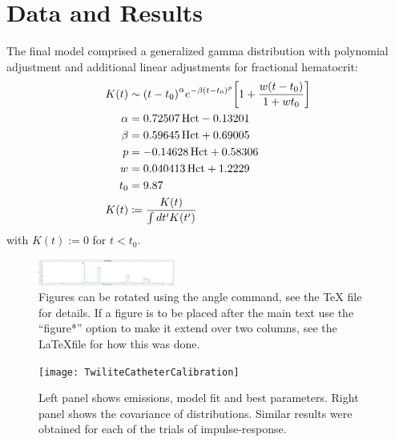 \section{Data and Results}

The final model comprised a generalized gamma distribution with polynomial
adjustment and additional linear adjustments for fractional hematocrit:
%
\begin{align}
	K(t) &\sim \qty(t - t_0)^\alpha e^{-\beta\qty(t - t_0)^p} 
	           \qty[1 + \frac{w \qty(t - t_0)}{1 + w t_0}] \\
	\alpha &= 0.72507 \, \text{Hct} - 0.13201 \\
	\beta &= 0.59645 \, \text{Hct} + 0.69005 \\
    p &= -0.14628 \, \text{Hct} + 0.58306 \\
	w &= 0.040413 \, \text{Hct} + 1.2229 \\
	t_0 & = 9.87 \\
	K(t) &\coloneqq \frac{K(t)}{\int dt' K(t')}
\end{align}
%
with $K(t) := 0$ for $t < t_0$.

\begin{figure}[htb]
\includegraphics[angle=90,width=4.5cm]{twilite-catheter-calibration-20190930.png}
\caption{Figures can be
rotated using the angle command, see the TeX file for details.  If a
figure is to be placed after the main text use the ``figure*'' option
to make it extend over two columns, see the \LaTeX file for how this
was done.}
\label{fig:twilite}
\end{figure}

\begin{figure}[htb]
\texttt{[image: TwiliteCatheterCalibration]}
\caption{Left panel shows emissions, model fit and best parameters.  Right panel
shows the covariance of distributions.  Similar results were obtained for each of the 
trials of impulse-response.}
\label{fig:twiliteCC_LRw}
\end{figure}


